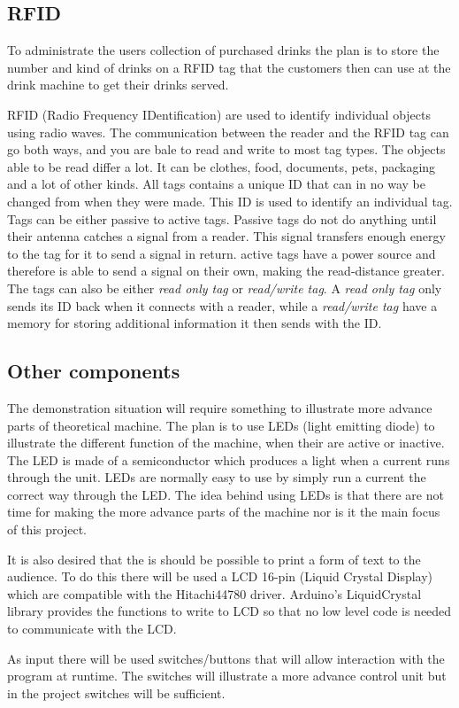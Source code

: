 \subsection{RFID}
To administrate the users collection of purchased drinks the plan is to store the number and kind of drinks on a RFID tag that the customers then can use at the drink machine to get their drinks served.

RFID (Radio Frequency IDentification) are used to identify individual objects using radio waves.
The communication between the reader and the RFID tag can go both ways, and you are bale to read and write to most tag types. 
The objects able to be read differ a lot. It can be clothes, food, documents, pets, packaging and a lot of other kinds. 
All tags contains a unique ID that can in no way be changed from when they were made. This ID is used to identify an individual tag.
Tags can be either passive to active tags. Passive tags do not do anything until their antenna catches a signal from a reader. This signal transfers enough energy to the tag for it to send a signal in return. active tags have a power source and therefore is able to send a signal on their own, making the read-distance greater.
The tags can also be either \textit{read only tag} or \textit{read/write tag}. A \textit{read only tag} only sends its ID back when it connects with a reader, while a \textit{read/write tag} have a memory for storing additional information it then sends with the ID. 

\subsection{Other components}
The demonstration situation will require something to illustrate more advance parts of theoretical machine. The plan is to use LEDs (light emitting diode) to illustrate the different function of the machine, when their are active or inactive. The LED is made of a semiconductor which produces a light when a current runs through the unit. LEDs are normally easy to use by simply run a current the correct way through the LED.
The idea behind using LEDs is that there are not time for making the more advance parts of the machine nor is it the main focus of this project.

It is also desired that the is should be possible to print a form of text to the audience. To do this there will be used a LCD 16-pin (Liquid Crystal Display) which are compatible with the Hitachi44780 driver. Arduino's LiquidCrystal library provides the functions to write to LCD so that no low level code is needed to communicate with the LCD.

As input there will be used switches/buttons that will allow interaction with the program at runtime. The switches will illustrate a more advance control unit but in the project switches will be sufficient.